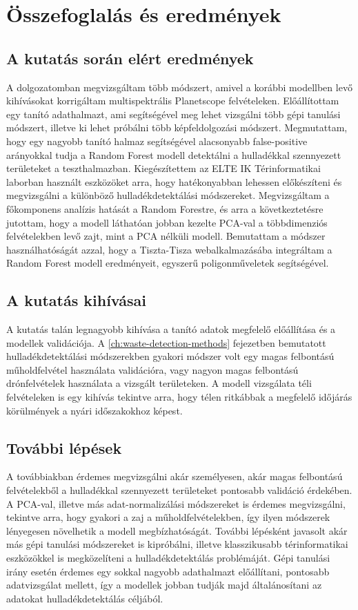 \chapter{Összefoglalás és eredmények}
\label{ch:sum}

\section{A kutatás során elért eredmények}

A dolgozatomban megvizsgáltam több módszert, amivel a korábbi modellben levő kihívásokat korrigáltam multispektrális Planetscope felvételeken. Előállítottam egy tanító adathalmazt, ami segítségével meg lehet vizsgálni több gépi tanulási módszert, illetve ki lehet próbálni több képfeldolgozási módszert. Megmutattam, hogy egy nagyobb tanító halmaz segítségével alacsonyabb false-positive arányokkal tudja a Random Forest modell detektálni a hulladékkal szennyezett területeket a teszthalmazban. Kiegészítettem az ELTE IK Térinformatikai laborban használt eszközöket arra, hogy hatékonyabban lehessen előkészíteni és megvizsgálni a különböző hulladékdetektálási módszereket. Megvizsgáltam a főkomponens analízis hatását a Random Forestre, és arra a következtetésre jutottam, hogy a modell láthatóan jobban kezelte PCA-val a többdimenziós felvételekben levő zajt, mint a PCA nélküli modell. Bemutattam a módszer használhatóságát azzal, hogy a Tiszta-Tisza webalkalmazásába integráltam a Random Forest modell eredményeit, egyszerű poligonműveletek segítségével.

\section{A kutatás kihívásai}

A kutatás talán legnagyobb kihívása a tanító adatok megfelelő előállítása és a modellek validációja. A \ref{ch:waste-detection-methods} fejezetben bemutatott hulladékdetektálási módszerekben gyakori módszer volt egy magas felbontású műholdfelvétel használata validációra, vagy nagyon magas felbontású drónfelvételek használata a vizsgált területeken. A modell vizsgálata téli felvételeken is egy kihívás tekintve arra, hogy télen ritkábbak a megfelelő időjárás körülmények a nyári időszakokhoz képest. 

\section{További lépések}

A továbbiakban érdemes megvizsgálni akár személyesen, akár magas felbontású felvételekből a hulladékkal szennyezett területeket pontosabb validáció érdekében. A PCA-val, illetve más adat-normalizálási módszereket is érdemes megvizsgálni, tekintve arra, hogy gyakori a zaj a műholdfelvételekben, így ilyen módszerek lényegesen növelhetik a modell megbízhatóságát. További lépésként javasolt akár más gépi tanulási módszereket is kipróbálni, illetve klasszikusabb térinformatikai eszközökkel is megközelíteni a hulladékdetektálás problémáját. Gépi tanulási irány esetén érdemes egy sokkal nagyobb adathalmazt előállítani, pontosabb adatvizsgálat mellett, így a modellek jobban tudják majd általánosítani az adatokat hulladékdetektálás céljából.
